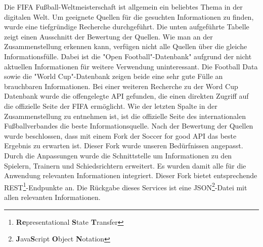 \documentclass[runningheads,a4paper]{llncs}
\begin{document}
Die FIFA Fußball-Weltmeisterschaft ist allgemein ein beliebtes Thema in der digitalen Welt. Um geeignete Quellen für die gesuchten Informationen zu finden, wurde eine tiefgründige Recherche durchgeführt. Die unten aufgeführte Tabelle zeigt einen Ausschnitt der Bewertung der Quellen. Wie man an der Zusammenstellung erkennen kann, verfügen nicht alle Quellen über die gleiche Informationsfülle. Dabei ist die "Open Football"{}-Datenbank" aufgrund der nicht aktuellen Informationen für weitere Verwendung uninteressant. Die Football Data sowie die "World Cup"{}-Datenbank zeigen beide eine sehr gute Fülle an brauchbaren Informationen. Bei einer weiteren Recherche zu der Word Cup Datenbank wurde die offengelegte API gefunden, die einen direkten Zugriff auf die offizielle Seite der FIFA ermöglicht. Wie der letzten Spalte in der Zusammenstellung zu entnehmen ist, ist die offizielle Seite des internationalen Fußballverbandes die beste Informationsquelle. 
Nach der Bewertung der Quellen wurde beschlossen, dass mit einem Fork der Soccer for good API das beste Ergebnis zu erwarten ist. Dieser Fork wurde unseren Bedürfnissen angepasst. Durch die Anpassungen wurde die Schnittstelle um Informationen zu den Spielern, Trainern und Schiedsrichtern erweitert. Es wurden damit alle für die Anwendung relevanten Informationen integriert. Dieser Fork bietet entsprechende REST\footnote{\textbf{Re}presentational \textbf{S}tate \textbf{T}ransfer}-Endpunkte an. Die Rückgabe dieses Services ist eine JSON\footnote{\textbf{J}ava\textbf{S}cript \textbf{O}bject \textbf{N}otation}-Datei mit allen relevanten Informationen.
\end{document}
